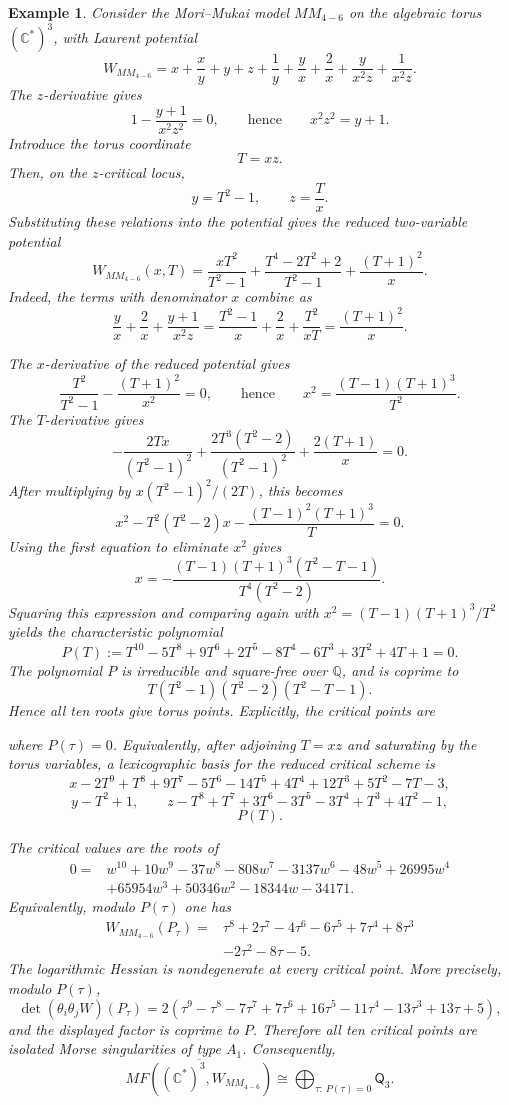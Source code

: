\documentclass[11pt]{amsart}
\newtheorem{example}{Example}[section]
\newcommand{\MorseCat}[1]{\mathsf{Q}_{#1}}
\newcommand{\fitdisplay}[1]{%
  \begin{center}%
  \resizebox{\textwidth}{!}{$\displaystyle #1$}%
  \end{center}%
}
\begin{document}
\begin{example}
Consider the Mori--Mukai model $MM_{4-6}$ on the algebraic torus
$(\mathbb{C}^*)^3$, with Laurent potential
\[
W_{MM_{4-6}}=x+\frac{x}{y}+y+z+\frac{1}{y}
+\frac{y}{x}+\frac{2}{x}+\frac{y}{x^2z}+\frac{1}{x^2z}.
\]
The $z$-derivative gives
\[
1-\frac{y+1}{x^2z^2}=0,
\qquad\text{hence}\qquad
x^2z^2=y+1.
\]
Introduce the torus coordinate
\[
T=xz.
\]
Then, on the $z$-critical locus,
\[
y=T^2-1,
\qquad
z=\frac{T}{x}.
\]
Substituting these relations into the potential gives the reduced two-variable
potential
\[
W_{MM_{4-6}}(x,T)=
\frac{xT^2}{T^2-1}
+\frac{T^4-2T^2+2}{T^2-1}
+\frac{(T+1)^2}{x}.
\]
Indeed, the terms with denominator $x$ combine as
\[
\frac{y}{x}+\frac{2}{x}+\frac{y+1}{x^2z}
=\frac{T^2-1}{x}+\frac{2}{x}+\frac{T^2}{xT}
=\frac{(T+1)^2}{x}.
\]

The $x$-derivative of the reduced potential gives
\[
\frac{T^2}{T^2-1}-\frac{(T+1)^2}{x^2}=0,
\qquad\text{hence}\qquad
x^2=\frac{(T-1)(T+1)^3}{T^2}.
\]
The $T$-derivative gives
\[
-\frac{2Tx}{(T^2-1)^2}
+\frac{2T^3(T^2-2)}{(T^2-1)^2}
+\frac{2(T+1)}{x}=0.
\]
After multiplying by $x(T^2-1)^2/(2T)$, this becomes
\[
x^2-T^2(T^2-2)x-\frac{(T-1)^2(T+1)^3}{T}=0.
\]
Using the first equation to eliminate $x^2$ gives
\[
x=-\frac{(T-1)(T+1)^3(T^2-T-1)}{T^4(T^2-2)}.
\]
Squaring this expression and comparing again with
$x^2=(T-1)(T+1)^3/T^2$ yields the characteristic polynomial
\[
P(T):=T^{10}-5T^8+9T^6+2T^5-8T^4
-6T^3+3T^2+4T+1=0.
\]
The polynomial $P$ is irreducible and square-free over $\mathbb{Q}$, and is
coprime to
\[
T(T^2-1)(T^2-2)(T^2-T-1).
\]
Hence all ten roots give torus points. Explicitly, the critical points are
\fitdisplay{P_\tau=\left(
-\frac{(\tau-1)(\tau+1)^3(\tau^2-\tau-1)}{\tau^4(\tau^2-2)},
\tau^2-1,
-\frac{\tau^5(\tau^2-2)}{(\tau-1)(\tau+1)^3(\tau^2-\tau-1)}
\right)}
where $P(\tau)=0$.
Equivalently, after adjoining $T=xz$ and saturating by the torus variables, a
lexicographic basis for the reduced critical scheme is
\[
x-2T^9+T^8+9T^7-5T^6-14T^5+4T^4+12T^3+5T^2-7T-3,
\]
\[
y-T^2+1,
\qquad
z-T^8+T^7+3T^6-3T^5-3T^4+T^3+4T^2-1,
\]
\[
P(T).
\]

The critical values are the roots of
\[
\begin{aligned}
0={}&w^{10}+10w^9-37w^8-808w^7-3137w^6-48w^5
+26995w^4 \\
&+65954w^3+50346w^2-18344w-34171.
\end{aligned}
\]
Equivalently, modulo $P(\tau)$ one has
\[
\begin{aligned}
W_{MM_{4-6}}(P_\tau)={}&
\tau^8+2\tau^7-4\tau^6-6\tau^5+7\tau^4+8\tau^3 \\
&-2\tau^2-8\tau-5.
\end{aligned}
\]
The logarithmic Hessian is nondegenerate at every critical point. More
precisely, modulo $P(\tau)$,
\[
\det(\theta_i\theta_jW)(P_\tau)
=2(\tau^9-\tau^8-7\tau^7+7\tau^6+16\tau^5-11\tau^4
-13\tau^3+13\tau+5),
\]
and the displayed factor is coprime to $P$. Therefore all ten critical points
are isolated Morse singularities of type $A_1$. Consequently,
\[
\overline{MF((\mathbb{C}^*)^3,W_{MM_{4-6}})}
\cong \bigoplus_{\tau:\,P(\tau)=0}\MorseCat{3}.
\]
\end{example}
\end{document}
